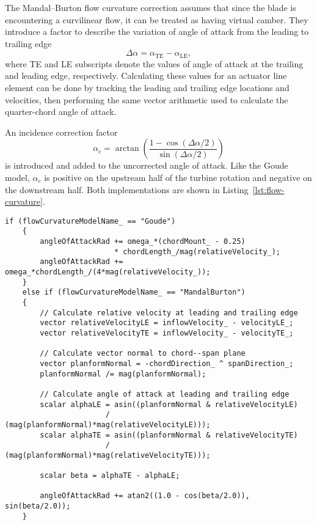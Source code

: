 The Mandal--Burton flow curvature correction assumes that since the blade is
encountering a curvilinear flow, it can be treated as having virtual camber.
They introduce a factor to describe the variation of angle of attack from the
leading to trailing edge
\begin{equation}
    \Delta \alpha = \alpha_\mathrm{TE} - \alpha_\mathrm{LE},
    \label{eq:Mandal-Burton-alpha-diff}
\end{equation}
where TE and LE subscripts denote the values of angle of attack at the trailing
and leading edge, respectively. Calculating these values for an actuator line
element can be done by tracking the leading and trailing edge locations and
velocities, then performing the same vector arithmetic used to calculate the
quarter-chord angle of attack.

An incidence correction factor
\begin{equation}
    \alpha_c = \arctan \left( \frac{1 - \cos (\Delta \alpha / 2)}{\sin (\Delta
        \alpha / 2)} \right)
    \label{eq:Mandal-Burton-alpha-corr}
\end{equation}
is introduced and added to the uncorrected angle of attack. Like the Goude
model, $\alpha_c$ is positive on the upstream half of the turbine rotation and
negative on the downstream half. Both implementations are shown in
Listing~\ref{lst:flow-curvature}.

\begin{lstlisting}[float,caption=Flow curvature model implementation.,label=lst:flow-curvature]
    if (flowCurvatureModelName_ == "Goude")
    {
        angleOfAttackRad += omega_*(chordMount_ - 0.25)
                         * chordLength_/mag(relativeVelocity_);
        angleOfAttackRad += omega_*chordLength_/(4*mag(relativeVelocity_));
    }
    else if (flowCurvatureModelName_ == "MandalBurton")
    {
        // Calculate relative velocity at leading and trailing edge
        vector relativeVelocityLE = inflowVelocity_ - velocityLE_;
        vector relativeVelocityTE = inflowVelocity_ - velocityTE_;
    
        // Calculate vector normal to chord--span plane
        vector planformNormal = -chordDirection_ ^ spanDirection_;
        planformNormal /= mag(planformNormal);
        
        // Calculate angle of attack at leading and trailing edge
        scalar alphaLE = asin((planformNormal & relativeVelocityLE)
                       / (mag(planformNormal)*mag(relativeVelocityLE)));
        scalar alphaTE = asin((planformNormal & relativeVelocityTE)
                       / (mag(planformNormal)*mag(relativeVelocityTE)));
        
        scalar beta = alphaTE - alphaLE;
        
        angleOfAttackRad += atan2((1.0 - cos(beta/2.0)), sin(beta/2.0));
    }
\end{lstlisting}


